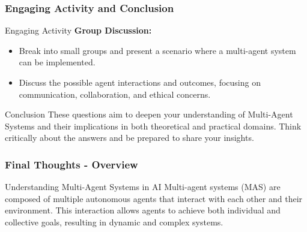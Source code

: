 \documentclass[aspectratio=169]{beamer}
\begin{document}
\begin{frame}[fragile]
    \frametitle{Engaging Activity and Conclusion}
    \begin{block}{Engaging Activity}
        \textbf{Group Discussion:}
        \begin{itemize}
            \item Break into small groups and present a scenario where a multi-agent system can be implemented.
            \item Discuss the possible agent interactions and outcomes, focusing on communication, collaboration, and ethical concerns.
        \end{itemize}
    \end{block}

    \begin{block}{Conclusion}
        These questions aim to deepen your understanding of Multi-Agent Systems and their implications in both theoretical and practical domains. Think critically about the answers and be prepared to share your insights.
    \end{block}
\end{frame}

\begin{frame}[fragile]
    \frametitle{Final Thoughts - Overview}
    \begin{block}{Understanding Multi-Agent Systems in AI}
        Multi-agent systems (MAS) are composed of multiple autonomous agents that interact with each other and their environment. This interaction allows agents to achieve both individual and collective goals, resulting in dynamic and complex systems.
    \end{block}
\end{frame}
\end{document}
